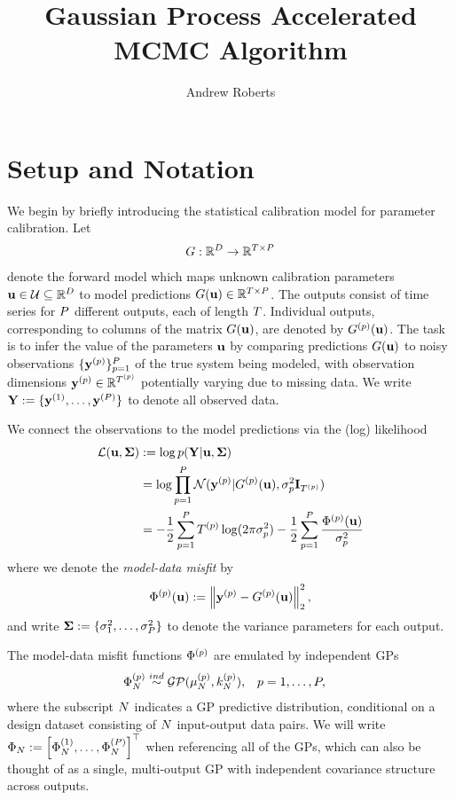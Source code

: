 \documentclass[12pt]{article}
\title{Gaussian Process Accelerated MCMC Algorithm}
\author{Andrew Roberts}
\begin{document}
\section{Setup and Notation}
We begin by briefly introducing the statistical calibration model for parameter calibration. Let 
\begin{align*}
\fwd: \R^{\Npar} \to \R^{\Ntime \times \Nobj}
\end{align*}
denote the forward model which maps unknown calibration parameters $\bpar \in \parSpace \subseteq \R^{\Npar}$ to model predictions 
$\fwd(\bpar) \in \R^{\Ntime \times \Nobj}$. The outputs consist of time series for $\Nobj$ different outputs, each of length $\Ntime$. 
Individual outputs, corresponding to columns of the matrix $\fwd(\bpar)$, are denoted by $\indexObj{\fwd}(\bpar)$. 
The task is to infer the value of the parameters $\bpar$ by comparing predictions $\fwd(\bpar)$ to noisy 
observations $\{\indexObj{\bstate}\}_{\objIdx=1}^{\Nobj}$ of the true system being modeled, with observation dimensions 
$\indexObj{\bstate} \in \R^{\indexObj{\Ntime}}$ potentially varying due to missing data. We write 
$\stateMat := \{\indexObj[1]{\bstate}, \dots, \indexObj[\Nobj]{\bstate} \}$ to denote all observed data. 

We connect the observations to the model predictions via the (log) likelihood 
\begin{align}
\llik(\bpar, \CovObs) 
&:= \log p(\stateMat|\bpar, \CovObs) \\
&= \log \prod_{\objIdx=1}^{\Nobj} \Gaussian(\indexObj{\bstate} | \indexObj{\fwd}(\bpar), \sdObs^2_{\objIdx} \idMat_{\indexObj{\Ntime}}) \\
&= -\frac{1}{2} \sum_{\objIdx=1}^{\Nobj} \indexObj{\Ntime} \log(2\pi \sdObs^2_{\objIdx}) - \frac{1}{2} \sum_{\objIdx=1}^{\Nobj} \frac{\indexObj{\SSR}(\bpar)}{\sdObs^2_{\objIdx}}
\end{align}
where we denote the \textit{model-data misfit} by 
\begin{align}
\indexObj{\SSR}(\bpar) := \norm{\indexObj{\bstate} - \indexObj{\fwd}(\bpar)}_2^2,
\end{align}
 and write $\CovObs := \{\sdObs^2_1, \dots, \sdObs^2_{\Nobj}\}$ to denote the variance parameters for each output. 
 
 The model-data misfit functions $\indexObj{\SSR}$ are emulated by independent GPs
 \begin{align}
&\SSRVecPredOut{\Ndesign}{\objIdx} \overset{ind}{\sim} \GP(\GPMeanPredOut{\Ndesign}{\objIdx}, \GPKerPredOut{\Ndesign}{\objIdx}), &&\objIdx = 1, \dots, \Nobj,
 \end{align}
 where the subscript $\Ndesign$ indicates a GP predictive distribution, conditional on a design dataset consisting of $\Ndesign$ input-output data pairs. We will write 
 $\indexDesign[\Ndesign]{\SSR} := \left[\SSRVecPredOut{\Ndesign}{1}, \dots, \SSRVecPredOut{\Ndesign}{\Nobj}\right]^\top$ when referencing all of the GPs, which can 
 also be thought of as a single, multi-output GP with independent covariance structure across outputs. 
 
\end{document}
